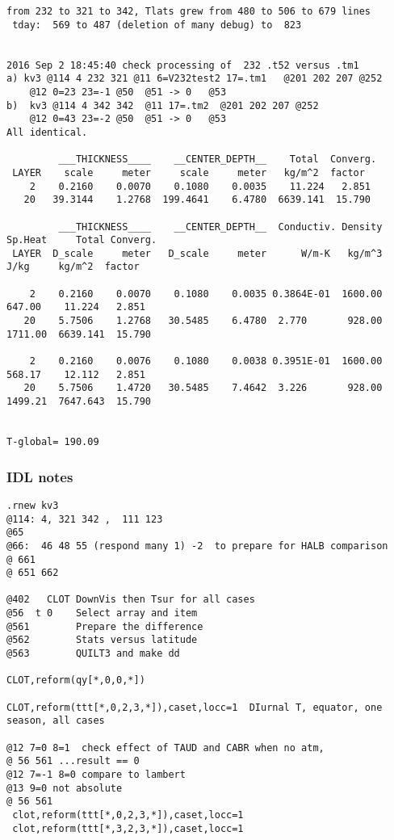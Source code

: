 \documentclass{article}
\begin{document}
\begin{verbatim}
from 232 to 321 to 342, Tlats grew from 480 to 506 to 679 lines
 tday:  569 to 487 (deletion of many debug) to  823


2016 Sep 2 18:45:40 check processing of  232 .t52 versus .tm1
a) kv3 @114 4 232 321 @11 6=V232test2 17=.tm1   @201 202 207 @252 
    @12 0=23 23=-1 @50  @51 -> 0   @53
b)  kv3 @114 4 342 342  @11 17=.tm2  @201 202 207 @252
    @12 0=43 23=-2 @50  @51 -> 0   @53
All identical.

         ___THICKNESS____    __CENTER_DEPTH__    Total  Converg.
 LAYER    scale     meter     scale     meter   kg/m^2  factor
    2    0.2160    0.0070    0.1080    0.0035    11.224   2.851  
   20   39.3144    1.2768  199.4641    6.4780  6639.141  15.790

         ___THICKNESS____    __CENTER_DEPTH__  Conductiv. Density Sp.Heat     Total Converg.
 LAYER  D_scale     meter   D_scale     meter      W/m-K   kg/m^3   J/kg     kg/m^2  factor

    2    0.2160    0.0070    0.1080    0.0035 0.3864E-01  1600.00  647.00    11.224   2.851
   20    5.7506    1.2768   30.5485    6.4780  2.770       928.00 1711.00  6639.141  15.790

    2    0.2160    0.0076    0.1080    0.0038 0.3951E-01  1600.00  568.17    12.112   2.851
   20    5.7506    1.4720   30.5485    7.4642  3.226       928.00 1499.21  7647.643  15.790

    
T-global= 190.09
\end{verbatim} 

\subsubsection{IDL notes \label{t2}} %
\begin{verbatim} 
.rnew kv3 
@114: 4, 321 342 ,  111 123 
@65  
@66:  46 48 55 (respond many 1) -2  to prepare for HALB comparison
@ 661
@ 651 662 

@402   CLOT DownVis then Tsur for all cases
@56  t 0    Select array and item
@561        Prepare the difference
@562        Stats versus latitude
@563        QUILT3 and make dd

CLOT,reform(qy[*,0,0,*])

CLOT,reform(ttt[*,0,2,3,*]),caset,locc=1  DIurnal T, equator, one season, all cases

@12 7=0 8=1  check effect of TAUD and CABR when no atm, 
@ 56 561 ...result == 0
@12 7=-1 8=0 compare to lambert
@13 9=0 not absolute
@ 56 561 
 clot,reform(ttt[*,0,2,3,*]),caset,locc=1
 clot,reform(ttt[*,3,2,3,*]),caset,locc=1
\end{verbatim} 
\end{document}
